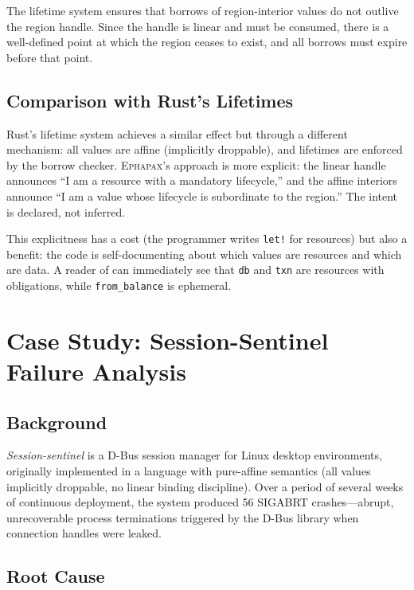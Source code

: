\documentclass[11pt,a4paper]{article}
\newcommand{\Ephapax}{\textsc{Ephapax}}
\begin{document}
The lifetime system ensures that borrows of region-interior values do not
outlive the region handle. Since the handle is linear and must be consumed,
there is a well-defined point at which the region ceases to exist, and all
borrows must expire before that point.

\subsection{Comparison with Rust's Lifetimes}

Rust's lifetime system achieves a similar effect but through a different
mechanism: all values are affine (implicitly droppable), and lifetimes are
enforced by the borrow checker. \Ephapax{}'s approach is more explicit: the
linear handle announces ``I am a resource with a mandatory lifecycle,'' and the
affine interiors announce ``I am a value whose lifecycle is subordinate to the
region.'' The intent is declared, not inferred.

This explicitness has a cost (the programmer writes \lstinline{let!} for
resources) but also a benefit: the code is self-documenting about which values
are resources and which are data. A reader of  can
immediately see that \lstinline{db} and \lstinline{txn} are resources with
obligations, while \lstinline{from_balance} is ephemeral.

\section{Case Study: Session-Sentinel Failure Analysis}
\label{sec:case-study}

\subsection{Background}

\textit{Session-sentinel} is a D-Bus session manager for Linux desktop
environments, originally implemented in a language with pure-affine semantics
(all values implicitly droppable, no linear binding discipline). Over a period
of several weeks of continuous deployment, the system produced 56 SIGABRT
crashes---abrupt, unrecoverable process terminations triggered by the D-Bus
library when connection handles were leaked.

\subsection{Root Cause}
\end{document}
